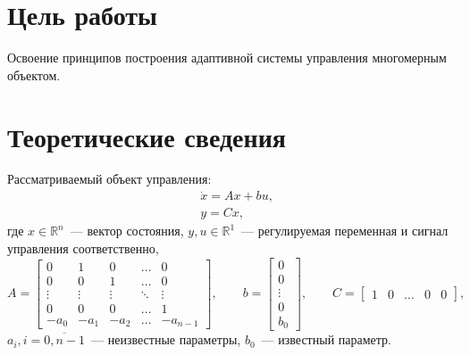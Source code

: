 \section{Цель работы}
Освоение принципов построения адаптивной системы управления многомерным объектом.


\section{Теоретические сведения}
Рассматриваемый объект управления:
\begin{equation}
    \begin{aligned}
        & \dot{x} = Ax + bu, \\
        & y = Cx,
    \end{aligned}
\end{equation}
где $x \in \mathbb{R}^n$~--- вектор состояния, $y, u \in \mathbb{R}^1$~--- регулируемая переменная и сигнал управления соответственно, 
\begin{equation}
    A =
    \begin{bmatrix}
        0 & 1 & 0 & \ldots & 0 \\
        0 & 0 & 1 & \ldots & 0 \\
        \vdots & \vdots & \vdots & \ddots & \vdots \\
        0 & 0 & 0 & \ldots & 1 \\
        -a_0 & -a_1 & -a_2 & \ldots & -a_{n-1}
    \end{bmatrix}\!\!,
    \qquad
    b =
    \begin{bmatrix}
        0 \\ 0 \\ \vdots \\ 0 \\ b_0
    \end{bmatrix}\!\!,
    \qquad
    C =
    \begin{bmatrix}
        1 & 0 & \ldots & 0 & 0
    \end{bmatrix}\!\!,
\end{equation}
$a_i, i=\overline{0, n-1}$~--- неизвестные параметры, $b_0$~--- известный параметр.

